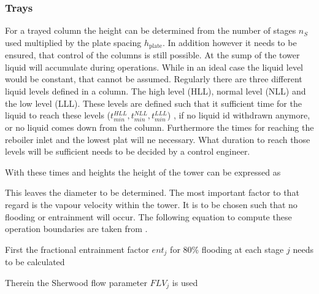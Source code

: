     \subsubsection{Trays}
        For a trayed column the height can be determined from the number of stages $n_S$ used multiplied by
        the plate spacing $h_{\text{plate}}$. In addition however it needs to be ensured, that control of the
        columns is still possible. At the sump of the tower liquid will accumulate during operations.
        While in an ideal case the liquid level would be constant, that cannot be assumed. Regularly
        there are three different liquid levels defined in a column. The high level (HLL), normal
        level (NLL) and the low level (LLL). These levels are defined such that it sufficient time
        for the liquid to reach these levels ($t_{min}^{HLL}, t_{min}^{NLL}, t_{min}^{LLL}$) ,
        if no liquid id withdrawn anymore, or no liquid comes down from the column. Furthermore
        the times for reaching the reboiler inlet and the lowest plat will ne necessary.
        What duration to reach those levels will be sufficient needs to be decided by a control engineer.

        With these times and heights the height of the tower can be expressed as

        This leaves the diameter to be determined. The most important factor to that regard is the vapour velocity
        within the tower. It is to be chosen such that no flooding or entrainment will occur. The following equation
        to compute these operation boundaries are taken from \cite{Lygeros.1986}.

        First the fractional entrainment factor $ent_j$ for 80\% flooding at each stage $j$ needs to be calculated

        Therein the Sherwood flow parameter $FLV_j$ is used

